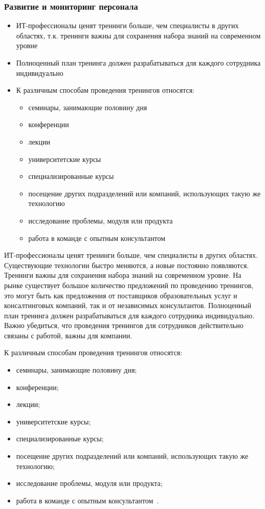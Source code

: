 \documentclass{../industrial-development}
\begin{document}
\begin{frame} \frametitle{Развитие и мониторинг персонала}
  \begin{itemize}
		\item ИТ-профессионалы ценят тренинги больше, чем специалисты в других областях, т.к. тренинги важны для сохранения набора знаний на современном уровне 
		\item Полноценный план тренинга должен разрабатываться для каждого сотрудника индивидуально 
		\item К различным способам проведения тренингов относятся: 
		  \begin{itemize}
\item	семинары, занимающие половину дня
\item конференции
\item лекции
\item университетские курсы
\item специализированные курсы	
\item посещение других подразделений или компаний, использующих такую же технологию
\item исследование проблемы, модуля или продукта
\item работа в команде с опытным консультантом
  \end{itemize}

  \end{itemize}
\end{frame}

\lecturenotes

ИТ-профессионалы ценят тренинги больше, чем специалисты в других областях. Существующие технологии быстро меняются, а новые постоянно появляются. Тренинги важны для сохранения набора знаний на современном уровне. На рынке существует большое количество предложений по проведению тренингов, это могут быть как предложения от поставщиков образовательных услуг и консалтинговых компаний, так и от независимых консультантов. Полноценный план тренинга должен разрабатываться для каждого сотрудника индивидуально. Важно убедиться, что проведения тренингов для сотрудников действительно связаны с работой, важны для компании. 

К различным способам проведения тренингов относятся: 
  \begin{itemize}
\item	семинары, занимающие половину дня;
\item	конференции;
\item	лекции;
\item	университетские курсы;
\item	специализированные курсы;
\item	посещение других подразделений или компаний, использующих такую же технологию;
\item	исследование проблемы, модуля или продукта;
\item	работа в команде с опытным консультантом~\cite[с.~257--259]{Lein}.
  \end{itemize}
\end{document}
